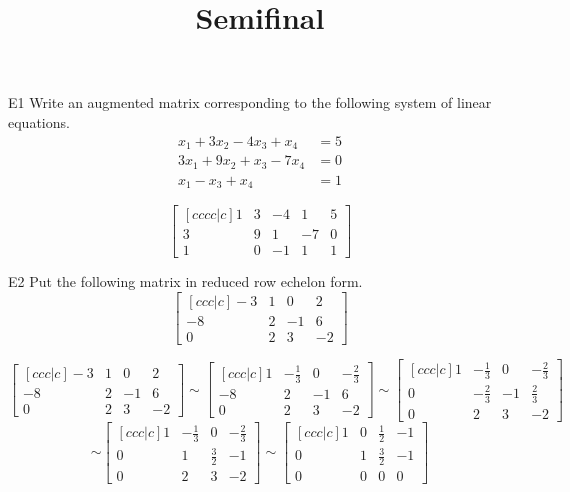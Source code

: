 \documentclass{sbgLAsemi}
\title{Semifinal}
\begin{document}
\begin{problem}{E1}
Write an augmented matrix corresponding to the following system of linear equations.
\begin{align*}
x_1+3x_2-4x_3 +x_4 &= 5 \\
3x_1+9x_2+x_3-7x_4 &= 0 \\
x_1-x_3 +x_4 &= 1
\end{align*}
\end{problem}
\begin{solution}
\[
\begin{bmatrix}[cccc|c]
1 & 3 & -4 & 1 & 5 \\
3 & 9 & 1 & -7 & 0 \\
1 & 0 & -1 & 1 &  1
\end{bmatrix}
\]
\end{solution}

\begin{problem}{E2}
Put the following matrix in reduced row echelon form.
$$\begin{bmatrix}[ccc|c] -3 & 1 & 0 & 2 \\ -8 & 2 & -1 & 6 \\ 0 & 2 & 3 & -2 \end{bmatrix}$$
\end{problem}
\begin{solution}
$$\begin{bmatrix}[ccc|c]
-3 & 1 & 0 & 2 \\
 -8 & 2 & -1 & 6 \\
 0 & 2 & 3 & -2
\end{bmatrix} \sim
\begin{bmatrix}[ccc|c]
1 & -\frac{1}{3} & 0 & -\frac{2}{3} \\
 -8 & 2 & -1 & 6 \\
 0 & 2 & 3 & -2
\end{bmatrix} \sim
\begin{bmatrix}[ccc|c]
1 & -\frac{1}{3} & 0 & -\frac{2}{3} \\
 0 & -\frac{2}{3} & -1 & \frac{2}{3} \\
 0 & 2 & 3 & -2
\end{bmatrix} $$
$$\sim
\begin{bmatrix}[ccc|c]
1 & -\frac{1}{3} & 0 & -\frac{2}{3} \\
 0 & 1 & \frac{3}{2} & -1 \\
 0 & 2 & 3 & -2
\end{bmatrix} \sim
\begin{bmatrix}[ccc|c]
1 & 0 & \frac{1}{2} & -1 \\
 0 & 1 & \frac{3}{2} & -1 \\
 0 & 0 & 0 & 0
\end{bmatrix}$$
\end{solution}
\end{document}

